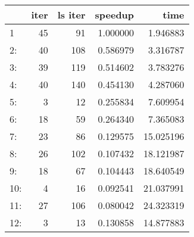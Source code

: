 \begin{tabular}{lrrrr}
\toprule
{} &  iter &  ls iter &   speedup &       time \\
\midrule
1   &    45 &       91 &  1.000000 &   1.946883 \\
2:  &    40 &      108 &  0.586979 &   3.316787 \\
3:  &    39 &      119 &  0.514602 &   3.783276 \\
4:  &    40 &      140 &  0.454130 &   4.287060 \\
5:  &     3 &       12 &  0.255834 &   7.609954 \\
6:  &    18 &       59 &  0.264340 &   7.365083 \\
7:  &    23 &       86 &  0.129575 &  15.025196 \\
8:  &    26 &      102 &  0.107432 &  18.121987 \\
9:  &    18 &       67 &  0.104443 &  18.640549 \\
10: &     4 &       16 &  0.092541 &  21.037991 \\
11: &    27 &      106 &  0.080042 &  24.323319 \\
12: &     3 &       13 &  0.130858 &  14.877883 \\
\bottomrule
\end{tabular}
